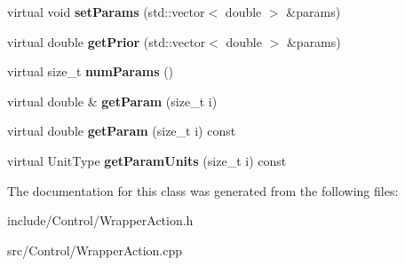 \begin{DoxyCompactItemize}
\item 
\hypertarget{classCartWheel_1_1WrapperAction_a49222d211d57078d8f926fa665f27c53}{
virtual void {\bfseries setParams} (std::vector$<$ double $>$ \&params)}
\label{classCartWheel_1_1WrapperAction_a49222d211d57078d8f926fa665f27c53}

\item 
\hypertarget{classCartWheel_1_1WrapperAction_a819dad1e8bc7e749a8f2d9ffb867c102}{
virtual double {\bfseries getPrior} (std::vector$<$ double $>$ \&params)}
\label{classCartWheel_1_1WrapperAction_a819dad1e8bc7e749a8f2d9ffb867c102}

\item 
\hypertarget{classCartWheel_1_1WrapperAction_aa32ff716ef344c0a37294d13c737a53b}{
virtual size\_\-t {\bfseries numParams} ()}
\label{classCartWheel_1_1WrapperAction_aa32ff716ef344c0a37294d13c737a53b}

\item 
\hypertarget{classCartWheel_1_1WrapperAction_a1ed08d384497028dca64ce0949022fca}{
virtual double \& {\bfseries getParam} (size\_\-t i)}
\label{classCartWheel_1_1WrapperAction_a1ed08d384497028dca64ce0949022fca}

\item 
\hypertarget{classCartWheel_1_1WrapperAction_a69d4d9154689fdfd65f1f404319c40b3}{
virtual double {\bfseries getParam} (size\_\-t i) const }
\label{classCartWheel_1_1WrapperAction_a69d4d9154689fdfd65f1f404319c40b3}

\item 
\hypertarget{classCartWheel_1_1WrapperAction_a45d458a858630e6909fb682293a19024}{
virtual UnitType {\bfseries getParamUnits} (size\_\-t i) const }
\label{classCartWheel_1_1WrapperAction_a45d458a858630e6909fb682293a19024}

\end{DoxyCompactItemize}


The documentation for this class was generated from the following files:\begin{DoxyCompactItemize}
\item 
include/Control/WrapperAction.h\item 
src/Control/WrapperAction.cpp\end{DoxyCompactItemize}
